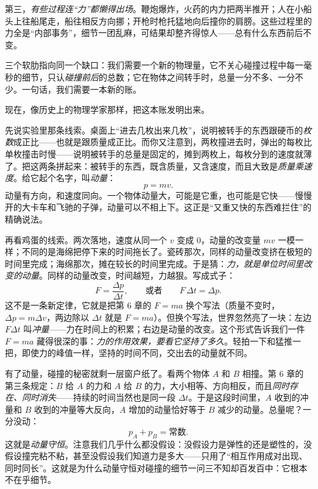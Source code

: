 第三，\emph{有些过程连“力”都懒得出场}。鞭炮爆炸，火药的内力把两半推开；人在小船头上往船尾走，船往相反方向挪；开枪时枪托猛地向后撞你的肩膀。这些过程里的力全是“内部事务”，细节一团乱麻，可结果却整齐得惊人——总有什么东西前后不变。

三个软肋指向同一个缺口：我们需要一个新的物理量，它不关心碰撞过程中每一毫秒的细节，只认\emph{碰撞前后}的总数；它在物体之间转手时，总量一分不多、一分不少。一句话，我们需要一本新的账。


现在，像历史上的物理学家那样，把这本账发明出来。

先说实验里那条线索。桌面上“进去几枚出来几枚”，说明被转手的东西跟硬币的\emph{枚数}成正比——也就是跟质量成正比。而你又注意到，两枚撞进去时，弹出的每枚比单枚撞击时慢——说明被转手的总量是固定的，摊到两枚上，每枚分到的速度就薄了。把这两条拼起来：被转手的东西，既含质量，又含速度，而且大致是\emph{质量乘速度}。给它起个名字，叫\emph{动量}：
\[
p=mv .
\]
动量有方向，和速度同向。一个物体动量大，可能是它重，也可能是它快——慢慢开的大卡车和飞驰的子弹，动量可以不相上下。这正是“又重又快的东西难拦住”的精确说法。

再看鸡蛋的线索。两次落地，速度从同一个 \(v\) 变成 \(0\)，动量的改变量 \(mv\) 一模一样；不同的是海绵把停下来的时间拖长了。瓷砖那次，同样的动量改变挤在极短的时间里完成；海绵那次，摊在较长的时间里完成。于是猜：\emph{力，就是单位时间里改变的动量}。同样的动量改变，时间越短，力越狠。写成式子：
\[
F=\frac{\Delta p}{\Delta t},\qquad\text{或者}\qquad F\,\Delta t=\Delta p .
\]
这不是一条新定律，它就是把第 6 章的 \(F=ma\) 换个写法（质量不变时，\(\Delta p=m\Delta v\)，两边除以 \(\Delta t\) 就是 \(F=ma\)）。但换个写法，世界忽然亮了一块：左边 \(F\Delta t\) 叫\emph{冲量}——力在时间上的积累；右边是动量的改变。这个形式告诉我们一件 \(F=ma\) 藏得很深的事：\emph{力的作用效果，要看它坚持了多久}。轻拍一下和猛推一把，即使力的峰值一样，坚持的时间不同，交出去的动量就不同。

有了动量，碰撞的秘密就剩一层窗户纸了。看两个物体 \(A\) 和 \(B\) 相撞。第 6 章的第三条规定：\(B\) 给 \(A\) 的力和 \(A\) 给 \(B\) 的力，大小相等、方向相反，而且\emph{同时存在、同时消失}——持续的时间当然也是同一段 \(\Delta t\)。于是这段时间里，\(A\) 收到的冲量和 \(B\) 收到的冲量等大反向，\(A\) 增加的动量恰好等于 \(B\) 减少的动量。总量呢？一分没动：
\[
p_{A}+p_{B}=\text{常数}.
\]
这就是\emph{动量守恒}。注意我们几乎什么都没假设：没假设力是弹性的还是塑性的，没假设撞完粘不粘，甚至没假设我们知道力是多大——只用了“相互作用成对出现、同时同长”。这就是为什么动量守恒对碰撞的细节一问三不知却百发百中：它根本不在乎细节。

